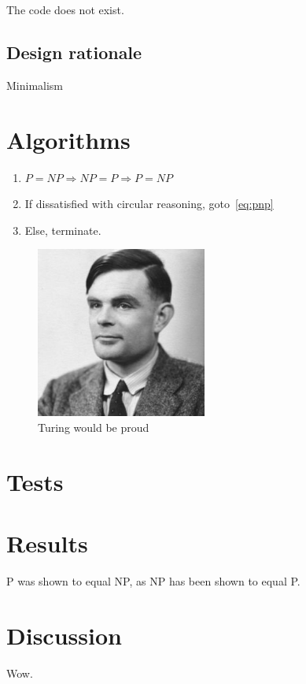 \documentclass[a4paper]{article}
\begin{document}
The code does not exist.

\subsection{Design rationale} %

Minimalism

\section{Algorithms} %

\begin{enumerate}
\item \label{eq:pnp}$P=NP \Rightarrow NP=P \Rightarrow P=NP $
\item If dissatisfied with circular reasoning, goto~\ref{eq:pnp}
\item Else, terminate.
\end{enumerate}

\begin{figure}[h!]
  \centering
  \includegraphics[width=0.5\textwidth]{img/turing-portrait.jpg}
  \caption{Turing would be proud}
  \label{fig:turing}
\end{figure}

\section{Tests} %

\section{Results} %

P was shown to equal NP, as NP has been shown to equal P.

\section{Discussion} %

Wow.

\printbibliography
\end{document}
